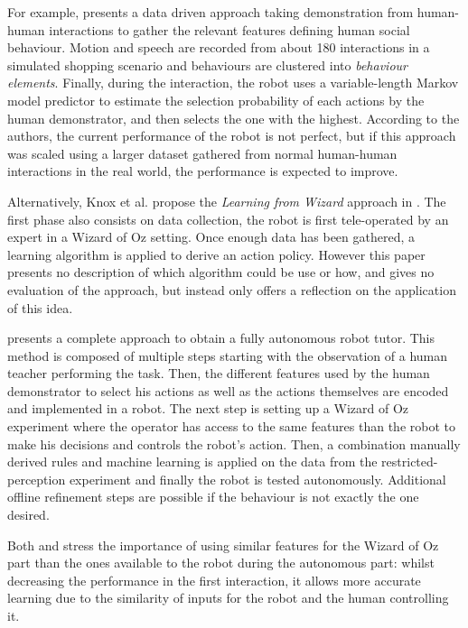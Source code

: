     For example, \citet{liu2014train} presents a data driven approach taking demonstration from human-human interactions to gather the relevant features defining human social behaviour. Motion and speech are recorded from about 180 interactions in a simulated shopping scenario and behaviours are clustered into \emph{behaviour elements}. Finally, during the interaction, the robot uses a variable-length Markov model predictor to estimate the selection probability of each actions by the human demonstrator, and then selects the one with the highest. According to the authors, the current performance of the robot is not perfect, but if this approach was scaled using a larger dataset gathered from normal human-human interactions in the real world, the performance is expected to improve.
    
    Alternatively, Knox et al. propose the \emph{Learning from Wizard} approach in \citep{knox2014learning}. The first phase also consists on data collection, the robot is first tele-operated by an expert in a Wizard of Oz setting. Once enough data has been gathered, a learning algorithm is applied to derive an action policy. However this paper presents no description of which algorithm could be use or how, and gives no evaluation of the approach, but instead only offers a reflection on the application of this idea.
    
    \citet{sequeira2016discovering} presents a complete approach to obtain a fully autonomous robot tutor. This method is composed of multiple steps starting with the observation of a human teacher performing the task. Then, the different features used by the human demonstrator to select his actions as well as the actions themselves are encoded and implemented in a robot. The next step is setting up a Wizard of Oz experiment where the operator has access to the same features than the robot to make his decisions and controls the robot's action. Then, a combination manually derived rules and machine learning is applied on the data from the restricted-perception experiment and finally the robot is tested autonomously. Additional offline refinement steps are possible if the behaviour is not exactly the one desired. 
    
    Both \citet{knox2014learning} and \citet{sequeira2016discovering} stress the importance of using similar features for the Wizard of Oz part than the ones available to the robot during the autonomous part: whilst decreasing the performance in the first interaction, it allows more accurate learning due to the similarity of inputs for the robot and the human controlling it.
    

